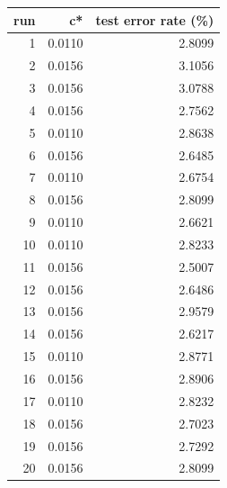 \begin{tabular}{rrr}
\toprule
run & c* & test error rate (\%) \\
\midrule
1 & 0.0110 & 2.8099 \\
2 & 0.0156 & 3.1056 \\
3 & 0.0156 & 3.0788 \\
4 & 0.0156 & 2.7562 \\
5 & 0.0110 & 2.8638 \\
6 & 0.0156 & 2.6485 \\
7 & 0.0110 & 2.6754 \\
8 & 0.0156 & 2.8099 \\
9 & 0.0110 & 2.6621 \\
10 & 0.0110 & 2.8233 \\
11 & 0.0156 & 2.5007 \\
12 & 0.0156 & 2.6486 \\
13 & 0.0156 & 2.9579 \\
14 & 0.0156 & 2.6217 \\
15 & 0.0110 & 2.8771 \\
16 & 0.0156 & 2.8906 \\
17 & 0.0110 & 2.8232 \\
18 & 0.0156 & 2.7023 \\
19 & 0.0156 & 2.7292 \\
20 & 0.0156 & 2.8099 \\
\bottomrule
\end{tabular}
